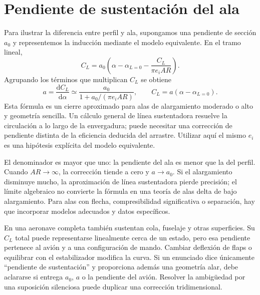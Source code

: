 \section{Pendiente de sustentación del ala}
Para ilustrar la diferencia entre perfil y ala, supongamos una pendiente de sección $a_0$ y representemos la inducción mediante el modelo equivalente. En el tramo lineal,
\begin{equation}
C_L=a_0\left(\alpha-\alpha_{L=0}-\frac{C_L}{\pi e_i AR}\right).
\end{equation}
Agrupando los términos que multiplican $C_L$ se obtiene
\begin{equation}\label{eq:10-slope}
a=\frac{\mathrm dC_L}{\mathrm d\alpha}
\simeq\frac{a_0}{1+a_0/(\pi e_i AR)},\qquad
C_L=a(\alpha-\alpha_{L=0}).
\end{equation}
Esta fórmula es un cierre aproximado para alas de alargamiento moderado o alto y geometría sencilla. Un cálculo general de línea sustentadora resuelve la circulación a lo largo de la envergadura; puede necesitar una corrección de pendiente distinta de la eficiencia deducida del arrastre. Utilizar aquí el mismo $e_i$ es una hipótesis explícita del modelo equivalente.

El denominador es mayor que uno: la pendiente del ala es menor que la del perfil. Cuando $AR\rightarrow\infty$, la corrección tiende a cero y $a\rightarrow a_0$. Si el alargamiento disminuye mucho, la aproximación de línea sustentadora pierde precisión; el límite algebraico no convierte la fórmula en una teoría de alas delta de bajo alargamiento. Para alas con flecha, compresibilidad significativa o separación, hay que incorporar modelos adecuados y datos específicos.

En una aeronave completa también sustentan cola, fuselaje y otras superficies. Su $C_L$ total puede representarse linealmente cerca de un estado, pero esa pendiente pertenece al avión y a una configuración de mando. Cambiar deflexión de flaps o equilibrar con el estabilizador modifica la curva. Si un enunciado dice únicamente ``pendiente de sustentación'' y proporciona además una geometría alar, debe aclararse si entrega $a_0$, $a$ o la pendiente del avión. Resolver la ambigüedad por una suposición silenciosa puede duplicar una corrección tridimensional.

